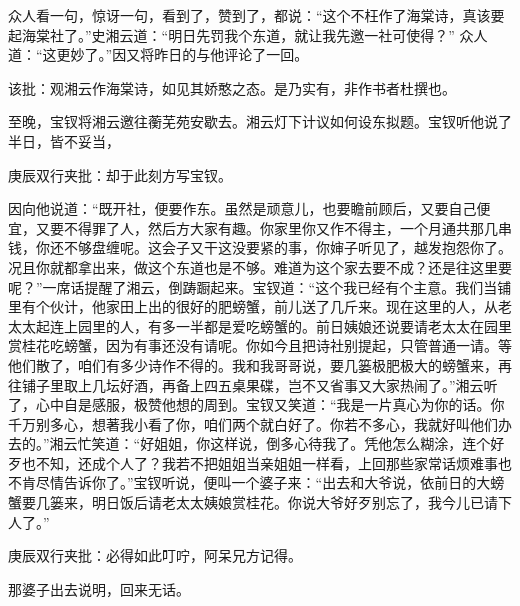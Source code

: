 \begin{parag}
    众人看一句，惊讶一句，看到了，赞到了，都说：“这个不枉作了海棠诗，真该要起海棠社了。”史湘云道：“明日先罚我个东道，就让我先邀一社可使得？” 众人道：“这更妙了。”因又将昨日的与他评论了一回。\begin{note}该批：观湘云作海棠诗，如见其娇憨之态。是乃实有，非作书者杜撰也。\end{note}
\end{parag}


\begin{parag}
    至晚，宝钗将湘云邀往蘅芜苑安歇去。湘云灯下计议如何设东拟题。宝钗听他说了半日，皆不妥当，\begin{note}庚辰双行夹批：却于此刻方写宝钗。\end{note}因向他说道：“既开社，便要作东。虽然是顽意儿，也要瞻前顾后，又要自己便宜，又要不得罪了人，然后方大家有趣。你家里你又作不得主，一个月通共那几串钱，你还不够盘缠呢。这会子又干这没要紧的事，你婶子听见了，越发抱怨你了。况且你就都拿出来，做这个东道也是不够。难道为这个家去要不成？还是往这里要呢？”一席话提醒了湘云，倒踌蹰起来。宝钗道：“这个我已经有个主意。我们当铺里有个伙计，他家田上出的很好的肥螃蟹，前儿送了几斤来。现在这里的人，从老太太起连上园里的人，有多一半都是爱吃螃蟹的。前日姨娘还说要请老太太在园里赏桂花吃螃蟹，因为有事还没有请呢。你如今且把诗社别提起，只管普通一请。等他们散了，咱们有多少诗作不得的。我和我哥哥说，要几篓极肥极大的螃蟹来，再往铺子里取上几坛好酒，再备上四五桌果碟，岂不又省事又大家热闹了。”湘云听了，心中自是感服，极赞他想的周到。宝钗又笑道：“我是一片真心为你的话。你千万别多心，想著我小看了你，咱们两个就白好了。你若不多心，我就好叫他们办去的。”湘云忙笑道：“好姐姐，你这样说，倒多心待我了。凭他怎么糊涂，连个好歹也不知，还成个人了？我若不把姐姐当亲姐姐一样看，上回那些家常话烦难事也不肯尽情告诉你了。”宝钗听说，便叫一个婆子来：“出去和大爷说，依前日的大螃蟹要几篓来，明日饭后请老太太姨娘赏桂花。你说大爷好歹别忘了，我今儿已请下人了。”\begin{note}庚辰双行夹批：必得如此叮咛，阿呆兄方记得。\end{note}那婆子出去说明，回来无话。
\end{parag}


